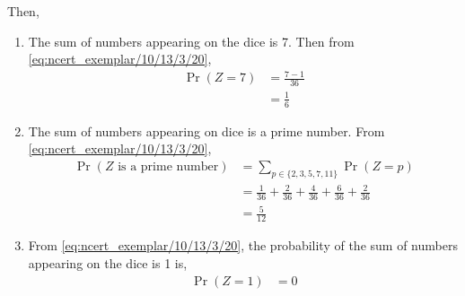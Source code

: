 \documentclass[]{article}
\begin{document}
Then,
\begin{enumerate}
\item{The sum of numbers appearing on the dice is 7. Then from \eqref{eq:ncert_exemplar/10/13/3/20},
\begin{align}
\Pr(Z=7) &= \frac{7-1}{36} \\
&= \frac{1}{6}
\end{align}
}
\item{ The sum of numbers appearing on dice is a prime number. From \eqref{eq:ncert_exemplar/10/13/3/20},
\begin{align}
\Pr(Z \text{ is a prime number}) &= \sum_{p \in \{2, 3, 5, 7, 11\}} \Pr(Z = p) \\
&= \frac{1}{36} + \frac{2}{36} + \frac{4}{36} + \frac{6}{36} + \frac{2}{36} \\
&= \frac{5}{12}
\end{align}
}
\item{ From \eqref{eq:ncert_exemplar/10/13/3/20}, the probability of the sum of numbers appearing on the dice is 1 is, 
\begin{align}
\Pr(Z=1) &= 0
\end{align}
}
\end{enumerate}
\end{document}
